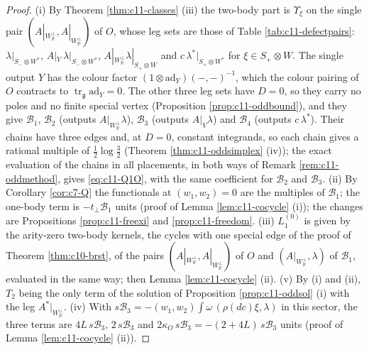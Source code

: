 \begin{proof}
(i) By Theorem \ref{thm:c11-classes} (iii) the two-body part is $\Upsilon_\xi$ on the single pair $(A|_{W_{\mathbb R}^\perp},A|_{W_{\mathbb R}^\perp})$ of $O$, whose leg sets are those of Table \ref{tab:c11-defectpairs}: $\lambda|_{S_-\otimes W^*}$, $A|_V\,\lambda|_{S_-\otimes W^*}$, $A|_{W_{\mathbb R}^\perp}\lambda|_{S_+\otimes W}$ and $c\,\lambda^*|_{S_+\otimes W^*}$ for $\xi\in S_+\otimes W$. The single output $Y$ has the colour factor $(1\otimes\mathrm{ad}_Y)(-,-)^{-1}$, which the colour pairing of $O$ contracts to $\operatorname{tr}_{\mathfrak g}\mathrm{ad}_Y=0$. The other three leg sets have $D=0$, so they carry no poles and no finite special vertex (Proposition \ref{prop:c11-oddbound}), and they give $\mathcal B_1$, $\mathcal B_2$ (outputs $A|_{W_{\mathbb R}^\perp}\lambda$), $\mathcal B_3$ (outputs $A|_V\lambda$) and $\mathcal B_4$ (outputs $c\,\lambda^*$). Their chains have three edges and, at $D=0$, constant integrands, so each chain gives a rational multiple of $\tfrac12\log\tfrac32$ (Theorem \ref{thm:c11-oddsimplex} (iv)); the exact evaluation of the chains in all placements, in both ways of Remark \ref{rem:c11-oddmethod}, gives \eqref{eq:c11-Q1O}, with the same coefficient for $\mathcal B_2$ and $\mathcal B_3$. (ii) By Corollary \ref{cor:c7-Q} the functionals at $(w_1,w_2)=0$ are the multiples of $\mathcal B_1$; the one-body term is $-t_\perp\mathcal B_1$ units (proof of Lemma \ref{lem:c11-cocycle} (i)); the changes are Propositions \ref{prop:c11-freexi} and \ref{prop:c11-freedom}. (iii) $L_1^{(0)}$ is given by the arity-zero two-body kernels, the cycles with one special edge of the proof of Theorem \ref{thm:c10-brst}, of the pairs $(A|_{W_{\mathbb R}^\perp},A|_{W_{\mathbb R}^\perp})$ of $O$ and $(A|_{W_{\mathbb R}^\perp},\lambda)$ of $\mathcal B_1$, evaluated in the same way; then Lemma \ref{lem:c11-cocycle} (ii). (v) By (i) and (ii), $T_2$ being the only term of the solution of Proposition \ref{prop:c11-oddsol} (i) with the leg $A^*|_{W_{\mathbb R}^\perp}$. (iv) With $s\mathcal B_3=-(w_1,w_2)\int\omega\,(\rho(dc)\xi,\lambda)$ in this sector, the three terms are $4L\,s\mathcal B_3$, $2\,s\mathcal B_3$ and $2\kappa_O\,s\mathcal B_3=-(2+4L)\,s\mathcal B_3$ units (proof of Lemma \ref{lem:c11-cocycle} (ii)).
\end{proof}

